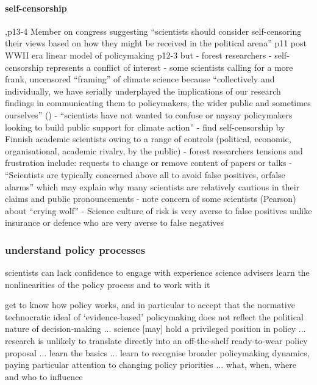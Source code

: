 \paragraph{self-censorship}
\cite{Pielke2007},p13-4 Member on congress suggesting ``scientists should consider self-censoring their views based on how they might be received in the political arena'' p11 post WWII era linear model of policymaking p12-3 but \cite{OjanenBKP2021} - forest researchers - self-censorship represents a conflict of interest
\cite{SimmsA2020,Carton2021,Bendell2024} - some scientists calling for a more frank, uncensored ``framing'' of climate science because ``collectively and individually, we have serially underplayed the implications of our research findings in communicating them to policymakers, the wider public and sometimes ourselves'' (\cite{CalverleyA2022})
\cite{Pearce2024} - ``scientists have not wanted to confuse or naysay policymakers looking to build public support for climate action''
\cite{ValiverronenS2021} - find self-censorship by Finnish academic scientists owing to a range of controls (political, economic, organisational, academic rivalry, by the public) 
\cite{OjanenBKP2021} - forest researchers tensions and frustration include: requests to change or remove content of papers or talks
\cite{ReadO2017} - ``Scientists are typically concerned above all to avoid false positives, orfalse alarms'' which may explain why many scientists are relatively cautious in their claims and public pronouncements
\cite{GregoryBW2024} - note concern of some scientists (Pearson) about ``crying wolf''
\cite{PoeS2023} - Science culture of risk is very averse to false positives unlike insurance or defence who are very averse to false negatives


\subsubsection{understand policy processes}
scientists can lack confidence to engage \cite{KEU2021perceptions,ElsensohnACDGGKPRS2019}
\cite{Obermeister2022} with experience science advisers learn the nonlinearities of the policy process and to work with it

 get to know how policy works, and in particular to accept that the normative technocratic ideal of `evidence-based' policymaking does not reflect the political nature of decision-making ... science [may] hold a privileged position in policy ... research is unlikely to translate directly into an off-the-shelf ready-to-wear policy proposal ... learn the basics ... learn to recognise broader policymaking dynamics, paying particular attention to changing policy priorities ... what, when, where and who to influence 
